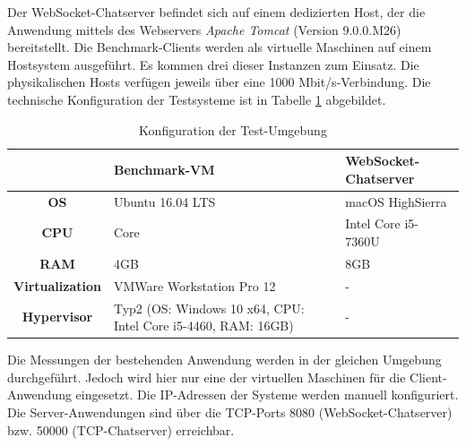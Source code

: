 \documentclass[11pt,a4paper,titlepage]{scrartcl}
\numberwithin{equation}{section}
\begin{document}
\noindent Der WebSocket-Chatserver befindet sich auf einem dedizierten Host, der die Anwendung mittels des Webservers \textit{Apache Tomcat} (Version 9.0.0.M26) bereitstellt. Die Benchmark-Clients werden als virtuelle Maschinen auf einem Hostsystem ausgeführt. Es kommen drei dieser Instanzen zum Einsatz. Die physikalischen Hosts verfügen jeweils über eine 1000 Mbit/s-Verbindung. Die technische Konfiguration der Testsysteme ist in Tabelle \ref{tbl:evalEnv} abgebildet. \\

\renewcommand{\arraystretch}{1.5}
\begin{table}[ht]
	\begin{center}
		\begin{tabular}{|c|>{\centering\arraybackslash}m{7cm}|>{\centering\arraybackslash}m{5cm}|}
			\hline
			 &  \textbf{Benchmark-VM} &  \textbf{WebSocket-Chatserver}  \\ \hline
			\textbf{OS} &  Ubuntu 16.04 LTS &  macOS HighSierra \\ \hline
			\textbf{CPU} &  1 Core &  Intel Core i5-7360U  \\ \hline
			\textbf{RAM} &  4GB &  8GB  \\ \hline
			\textbf{Virtualization} &  VMWare Workstation Pro 12 &  -  \\ \hline
			\textbf{Hypervisor} &  Typ2 (OS: Windows 10 x64, CPU: Intel Core i5-4460, RAM: 16GB) &  -  \\ \hline
		\end{tabular}
		\caption{Konfiguration der Test-Umgebung}\label{tbl:evalEnv}
	\end{center}
\end{table}
\renewcommand{\arraystretch}{1}
\noindent Die Messungen der bestehenden Anwendung werden in der gleichen Umgebung durchgeführt. Jedoch wird hier nur eine der virtuellen Maschinen für die Client-Anwendung eingesetzt. Die IP-Adressen der Systeme werden manuell konfiguriert. Die Server-Anwendungen sind über die TCP-Ports 8080 (WebSocket-Chatserver) bzw. 50000 (TCP-Chatserver) erreichbar. 
\end{document}

